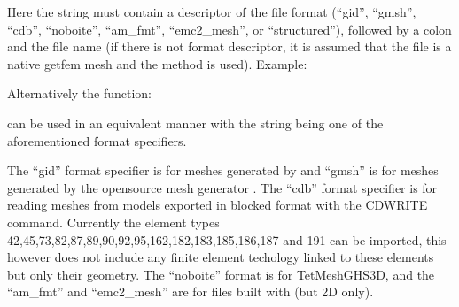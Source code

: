 \documentclass[a4paper,11pt,english]{sphinxmanual}
\begin{document}
Here the string  must contain a descriptor of the
file format (“gid”, “gmsh”, “cdb”, “noboite”, “am\_fmt”, “emc2\_mesh”,
or “structured”), followed by a colon and the file name (if there is
not format descriptor, it is assumed that the file is a native getfem
mesh and the  method is used). Example:

\begin{sphinxVerbatim}[commandchars=\\\{\}]
 
\end{sphinxVerbatim}

Alternatively the function:

\begin{sphinxVerbatim}[commandchars=\\\{\}]
      
                  
\end{sphinxVerbatim}

can be used in an equivalent manner with the string  being one of
the aforementioned format specifiers.

The “gid” format specifier is for meshes generated by  and “gmsh”
is for meshes generated by the open\sphinxhyphen{}source mesh generator .
The “cdb” format specifier is for reading meshes from  models
exported in blocked format with the CDWRITE command. Currently the
 element types 42,45,73,82,87,89,90,92,95,162,182,183,185,186,187
and 191 can be imported, this however does not include any finite element
techology linked to these elements but only their geometry.
The “noboite” format is for TetMesh\sphinxhyphen{}GHS3D, and the
“am\_fmt” and “emc2\_mesh” are for files built with  (but 2D only).
\end{document}
